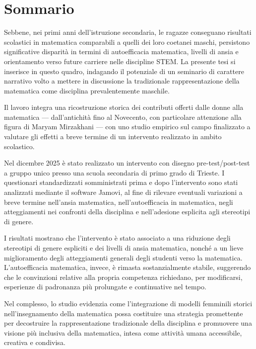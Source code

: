 \chapter*{Sommario}
Sebbene, nei primi anni dell'istruzione secondaria, le ragazze conseguano risultati scolastici in matematica comparabili a quelli dei loro coetanei maschi, persistono significative disparità in termini di autoefficacia matematica, livelli di ansia e orientamento verso future carriere nelle discipline STEM. La presente tesi si inserisce in questo quadro, indagando il potenziale di un seminario di carattere narrativo volto a mettere in discussione la tradizionale rappresentazione della matematica come disciplina prevalentemente maschile.

Il lavoro integra una ricostruzione storica dei contributi offerti dalle donne alla matematica — dall'antichità fino al Novecento, con particolare attenzione alla figura di Maryam Mirzakhani — con uno studio empirico sul campo finalizzato a valutare gli effetti a breve termine di un intervento realizzato in ambito scolastico.

Nel dicembre 2025 è stato realizzato un intervento con disegno pre-test/post-test a gruppo unico presso una scuola secondaria di primo grado di Trieste. I questionari standardizzati somministrati prima e dopo l'intervento sono stati analizzati mediante il software Jamovi, al fine di rilevare eventuali variazioni a breve termine nell'ansia matematica, nell'autoefficacia in matematica, negli atteggiamenti nei confronti della disciplina e nell'adesione esplicita agli stereotipi di genere.

I risultati mostrano che l'intervento è stato associato a una riduzione degli stereotipi di genere espliciti e dei livelli di ansia matematica, nonché a un lieve miglioramento degli atteggiamenti generali degli studenti verso la matematica. L'autoefficacia matematica, invece, è rimasta sostanzialmente stabile, suggerendo che le convinzioni relative alla propria competenza richiedano, per modificarsi, esperienze di padronanza più prolungate e continuative nel tempo.

Nel complesso, lo studio evidenzia come l'integrazione di modelli femminili storici nell'insegnamento della matematica possa costituire una strategia promettente per decostruire la rappresentazione tradizionale della disciplina e promuovere una visione più inclusiva della matematica, intesa come attività umana accessibile, creativa e condivisa.